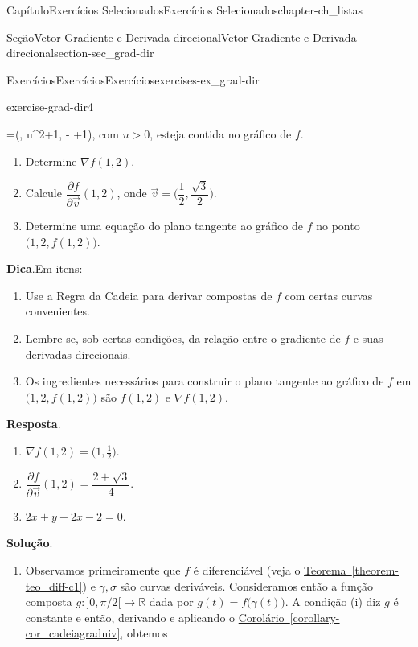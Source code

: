\documentclass[oneside,10pt,]{book}
\newcommand{\blocktitlefont}{\relax}
\newcommand{\xreffont}{\relax}
\numberwithin{equation}{section}
\newcommand{\R}{\mathbb R}
\begin{document}
\begin{chapterptx}{Capítulo}{Exercícios Selecionados}{}{Exercícios Selecionados}{}{}{chapter-ch_listas}
\begin{sectionptx}{Seção}{Vetor Gradiente e Derivada direcional}{}{Vetor Gradiente e Derivada direcional}{}{}{section-sec_grad-dir}
\begin{exercises-subsection-numberless}{Exercícios}{Exercícios}{}{Exercícios}{}{}{exercises-ex_grad-dir}
\begin{divisionexercise}{4}{}{}{exercise-grad-dir4}
\begin{enumerate}[label=\roman*]
=\Big(, u^2+1,  -
 +1\Big)\), com \(u>0\), esteja contida no gráfico de \(f\).%
\end{enumerate}
%
\par
%
\begin{enumerate}[label=\alph*]
\item{}Determine \(\nabla f(1,2)\).%
\item{}Calcule \(\dfrac{\partial f}{\partial
\vec{v}}(1,2)\), onde \(\vec{v} = \Big( \dfrac{1}{2},
\dfrac{\sqrt{3}}{2}\Big)\).%
\item{}Determine uma equação do plano tangente ao gráfico de \(f\) no ponto \(\big(1,2,f(1,2)\big)\).%
\end{enumerate}
%
\par\smallskip%
\noindent\textbf{\blocktitlefont Dica}.\hypertarget{hint-grad-dir4-b}{}\quad{}Em itens:%
\begin{enumerate}[label=\alph*.]
\item{}Use a Regra da Cadeia para derivar compostas de \(f\) com certas curvas convenientes.%
\item{}Lembre-se, sob certas condições, da relação entre o gradiente de \(f\) e suas derivadas direcionais.%
\item{}Os ingredientes necessários para construir o plano tangente ao gráfico de \(f\) em \(\big(1,2,f(1,2)\big)\) são \(f(1,2)\) e \(\nabla f(1,2)\).%
\end{enumerate}
%
\par\smallskip%
\noindent\textbf{\blocktitlefont Resposta}.\hypertarget{answer-grad-dir4-c}{}\quad{}%
\begin{enumerate}[label=\alph*]
\item{}\(\nabla f(1,2)=\Big(1, \frac{1}{2}\Big)\).%
\item{}\(\dfrac{\partial f}{\partial \vec{v}}(1,2) =
\dfrac{2+\sqrt{3}}{4}\).%
\item{}\(2x+y-2x-2=0\).%
\end{enumerate}
%
\par\smallskip%
\noindent\textbf{\blocktitlefont Solução}.\hypertarget{solution-grad-dir4-d}{}\quad{}%
\begin{enumerate}[label=(\alph*)]
\item{}Observamos primeiramente que \(f\) é diferenciável (veja o \hyperref[theorem-teo_diff-c1]{Teorema~{\xreffont\ref{theorem-teo_diff-c1}}}) e \(\gamma, \sigma\) são curvas deriváveis. Consideramos então a função composta \(g\colon ]0, \pi/2[\to\R\) dada por \(g(t) = f\big(\gamma(t)\big)\). A condição (i) diz \(g\) é constante e então, derivando e aplicando o \hyperref[corollary-cor_cadeiagradniv]{Corolário~{\xreffont\ref{corollary-cor_cadeiagradniv}}}, obtemos%

\end{enumerate}
\end{divisionexercise}
\end{exercises-subsection-numberless}
\end{sectionptx}
\end{chapterptx}
\end{document}
